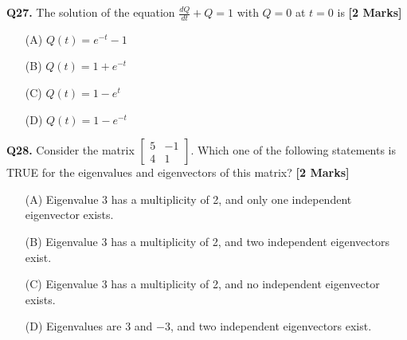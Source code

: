 \documentclass[11pt]{article}
\newcommand{\questionb}[2]{
    \noindent\textbf{Q#2.} #1 \hfill \textbf{[2 Marks]}
}
\begin{document}
\vspace{0.5cm}

\questionb{The solution of the equation $\frac{dQ}{dt} + Q = 1$ with $Q = 0$ at $t = 0$ is}{27}
\begin{enumerate}
    \item[(A)] $Q(t) = e^{-t} - 1$
    \item[(B)] $Q(t) = 1 + e^{-t}$
    \item[(C)] $Q(t) = 1 - e^{t}$
    \item[(D)] $Q(t) = 1 - e^{-t}$
\end{enumerate}

\vspace{0.5cm}

\questionb{Consider the matrix $\begin{bmatrix} 5 & -1 \\ 4 & 1 \end{bmatrix}$. Which one of the following statements is TRUE for the eigenvalues and eigenvectors of this matrix?}{28}
\begin{enumerate}
    \item[(A)] Eigenvalue 3 has a multiplicity of 2, and only one independent eigenvector exists.
    \item[(B)] Eigenvalue 3 has a multiplicity of 2, and two independent eigenvectors exist.
    \item[(C)] Eigenvalue 3 has a multiplicity of 2, and no independent eigenvector exists.
    \item[(D)] Eigenvalues are 3 and $-3$, and two independent eigenvectors exist.
\end{enumerate}

\vspace{0.5cm}
\end{document}
